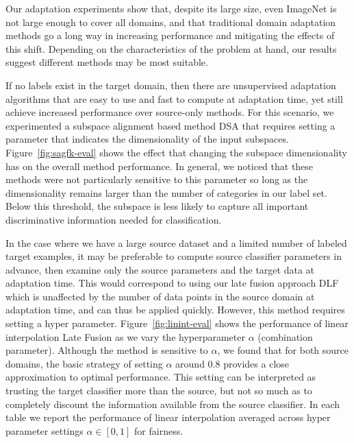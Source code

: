 Our adaptation experiments show that, despite its large size, even ImageNet is not large enough to cover all domains, and
that traditional domain adaptation methods go a long way in increasing performance and mitigating the effects of this shift.
Depending on the characteristics of the problem at hand, our results suggest different methods may be most suitable.

If no labels exist in the target domain, then there are unsupervised adaptation algorithms that are easy to use and fast to compute at adaptation time, yet still achieve increased performance over source-only methods. 
For this scenario, we experimented a subspace alignment based method DSA that requires setting a parameter that indicates the dimensionality of the input subspaces. 
Figure~\ref{fig:sagfk-eval} shows the effect that changing the subspace dimensionality has on the overall method performance. 
In general, we noticed that these methods were not particularly sensitive to this parameter so long as the dimensionality remains larger than the number of categories in our label set.
Below this threshold, the subspace is less likely to capture all important discriminative information needed for classification.

In the case where we have a large source dataset and a limited number of labeled target examples, it may be preferable to compute source classifier parameters in advance, then examine only the source parameters and the target data at adaptation time.
This would correspond to using our late fusion approach DLF which is unaffected by the number of data points in the source domain at adaptation time, and can thus be applied quickly.
However, this method requires setting a hyper parameter. 
Figure~\ref{fig:linint-eval} shows the performance of linear interpolation Late Fusion as we vary the hyperparameter $\alpha$ (combination parameter).
Although the method is sensitive to $\alpha$, we found that for both source domains, the basic strategy of setting $\alpha$ around $0.8$ provides a close approximation to optimal performance. 
This setting can be interpreted as trusting the target classifier more than the source, but not so much as to completely discount the information available from the source classifier. In each table we report the performance of linear interpolation averaged across hyper parameter settings $\alpha \in [0,1]$ for fairness.

